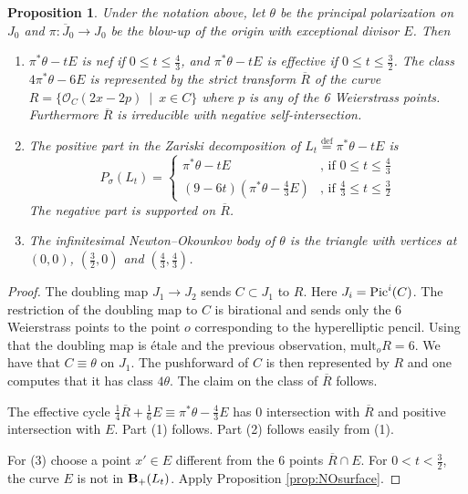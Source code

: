 \documentclass[12pt]{amsart}
\newtheorem{proposition}[lemma]{Proposition}
\theoremstyle{definition}
\renewcommand{\leq}{\leqslant}
\newcommand{\deq}{\ensuremath{\stackrel{\textrm{def}}{=}}}
\newcommand{\?}{ \circled{{\large\bf ?}}}
\let\cal\mathcal
\begin{document}
\begin{proposition}\label{prop:genus2surface}
Under the notation above, let $\theta$ be the principal polarization on $J_0$ and $\pi:\overline J_0\to J_0$ be the blow-up of the origin with exceptional divisor $E$. Then 
	\begin{enumerate}
		\item $\pi^*\theta-tE$ is nef if $0\leq t\leq\frac 43$, and $\pi^*\theta-tE$ is effective if $0\leq t\leq\frac 32$. The class $4\pi^*\theta-6E$ is represented by the strict transform $\overline R$ of the curve $R=\{\cal O_C(2x-2p)\ \mid\ x\in C\}$ where $p$ is any of the 6 Weierstrass points. Furthermore $\overline R$ is irreducible with negative self-intersection.
		\smallskip
		
		\item The positive part in the Zariski decomposition of $L_t\deq\pi^*\theta-tE$ is
		\[P_{\sigma}(L_t)=\begin{cases}
			\pi^*\theta-tE&\text{, if }0\leq t\leq\frac 43\\
			(9-6t)(\pi^*\theta-\frac 43E)&\text{, if }\frac 43\leq t\leq\frac 32
		\end{cases}\]
	The negative part is supported on $\overline R$.
	\smallskip
	
	\item The infinitesimal Newton--Okounkov body of $\theta$ is the triangle with vertices at $(0,0)$, $(\frac 32,0)$ and $(\frac 43,\frac 43)$. 	
	\end{enumerate}
\end{proposition}
\begin{proof}
The doubling map $J_1\to J_2$ sends $C\subset J_1$ to $R$.  Here $J_i={\rm Pic}^i(C)$. The restriction of the doubling map to $C$ is birational and sends only the 6 Weierstrass points to the point $o$ corresponding to the hyperelliptic pencil. Using that the doubling map is \' etale and the previous observation, $\text{mult}_oR=6$. We have that $C\equiv\theta$ on $J_1$. The pushforward of $C$ is then represented by $R$ and one computes that it has class $4\theta$. The claim on the class of $\overline R$ follows.

The effective cycle $\frac 14\overline R+\frac 16E\equiv\pi^*\theta-\frac 43E$ has 0 intersection with $\overline R$ and positive intersection with $E$. Part (1) follows.
Part (2) follows easily from (1).

For (3) choose a point $x'\in E$ different from the 6 points $\overline R\cap E$. For $0<t<\frac 32$, the curve $E$ is not in ${\bf B}_+(L_t)$. Apply Proposition \ref{prop:NOsurface}.
\end{proof}
\end{document}
